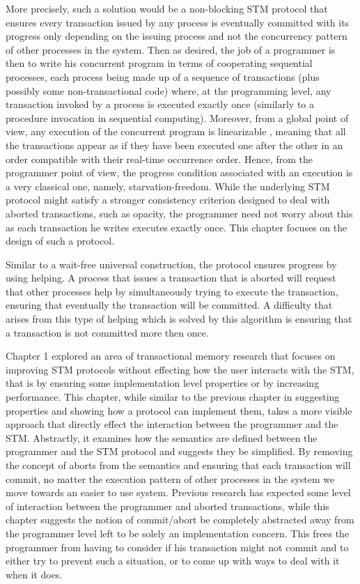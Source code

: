\documentclass[runningheads,a4paper]{article}
\begin{document}
More precisely, such a solution would be a non-blocking STM protocol that ensures every transaction
issued by any process is eventually committed with its progress only depending
on the issuing process and not the concurrency pattern of other processes in the system.
Then as desired, the job of a
programmer is then to write his concurrent program in terms of cooperating sequential
processes, each process being made up of a sequence of transactions (plus possibly
some non-transactional code) where,
at the programming level, any transaction invoked by
a process is executed exactly once (similarly to a procedure invocation in sequential
computing).
Moreover, from a global point of view, any execution of the concurrent
program is linearizable \cite{HW90}, meaning that all the transactions appear as if they have
been executed one after the other in an order compatible with their real-time occurrence
order. Hence, from the programmer point of view, the progress condition associated
with an execution is a very classical one, namely, starvation-freedom.
While the underlying STM protocol might satisfy a stronger consistency criterion
designed to deal with aborted transactions,
such as opacity, the programmer need not worry about this as each transaction
he writes executes exactly once.
This chapter focuses on the design of such a protocol.



Similar to a wait-free universal construction, the protocol ensures progress
by using helping.
A process that issues a transaction that is aborted will request 
that other processes help by simultaneously trying to execute the transaction,
ensuring that eventually the transaction will be committed.
A difficulty that arises from this type of helping 
which is solved by this algorithm
is ensuring that a transaction is not committed more then once.


Chapter 1 explored an area of transactional memory
research that focuses on improving STM protocols without effecting
how the user interacts with the STM, that is by ensuring some implementation
level properties or by increasing performance.
This chapter, while similar to the previous chapter in suggesting properties
and showing how a protocol can implement them,
takes a more visible approach
that directly effect the interaction between the programmer and
the STM.
Abstractly, it examines how the semantics are defined between
the programmer and the STM protocol and suggests they be simplified.
By removing the concept of aborts from the semantics and
ensuring that each transaction will commit, no matter the 
execution pattern of other processes in the system
we move towards an easier to use system.
Previous research has expected some level of interaction
between the programmer and aborted transactions, while this
chapter suggests the notion of commit/abort be completely abstracted
away from the programmer level left to be solely an implementation
concern.
This frees the programmer from having to consider if his transaction
might not commit and to either try to prevent such a situation, or to 
come up with ways to deal with it when it does.
\end{document}
